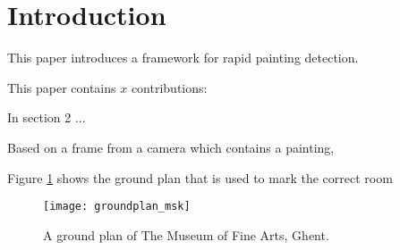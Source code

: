 \section{Introduction}
	This paper introduces a framework for rapid painting detection.
	
	
	
	
	
	
	This paper contains $x$ contributions:
	
	
	In section 2 ...

	
	Based on a frame from a camera which contains a painting, 
	
	Figure \ref{fig:groundplan_msk} shows the ground plan that is used to mark the correct room
	
	\begin{figure}
		\texttt{[image: groundplan\_msk]}
		\caption{A ground plan of The Museum of Fine Arts, Ghent. }
		\label{fig:groundplan_msk}
	\end{figure}